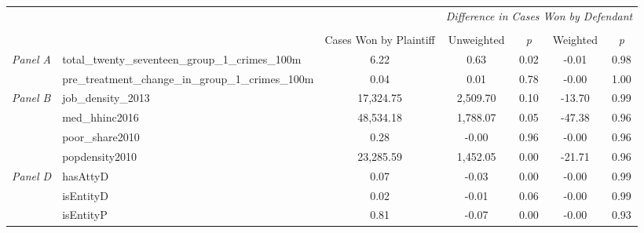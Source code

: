 \begin{tabular}{llccccc}
\toprule
 &  & \textit{} & \multicolumn{4}{c}{\textit{Difference in Cases Won by Defendant}} \\
\cline{4-7}
\\
 &  & Cases Won by Plaintiff & Unweighted & \emph{p} & Weighted & \emph{p} \\
\midrule
\multirow[c]{2}{3cm}{\textit{Panel A}} & total_twenty_seventeen_group_1_crimes_100m & 6.22 & 0.63 & 0.02 & -0.01 & 0.98 \\
 & pre_treatment_change_in_group_1_crimes_100m & 0.04 & 0.01 & 0.78 & -0.00 & 1.00 \\
\cline{1-7}
\multirow[c]{4}{3cm}{\textit{Panel B}} & job_density_2013 & 17,324.75 & 2,509.70 & 0.10 & -13.70 & 0.99 \\
 & med_hhinc2016 & 48,534.18 & 1,788.07 & 0.05 & -47.38 & 0.96 \\
 & poor_share2010 & 0.28 & -0.00 & 0.96 & -0.00 & 0.96 \\
 & popdensity2010 & 23,285.59 & 1,452.05 & 0.00 & -21.71 & 0.96 \\
\cline{1-7}
\multirow[c]{3}{3cm}{\textit{Panel D}} & hasAttyD & 0.07 & -0.03 & 0.00 & -0.00 & 0.99 \\
 & isEntityD & 0.02 & -0.01 & 0.06 & -0.00 & 0.99 \\
 & isEntityP & 0.81 & -0.07 & 0.00 & -0.00 & 0.93 \\
\cline{1-7}
\bottomrule
\end{tabular}
